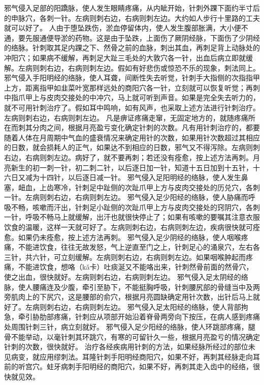 \documentclass[a4paper,12pt,UTF8,twoside]{ctexbook}
\begin{document}
邪气侵入足部的阳蹻脉，使人发生眼睛疼痛，从内眦开始，针刺外踝下面约半寸后的申脉穴，各刺一针。左病则刺右边，右病则刺左边。大约如人步行十里路的工夫就可以好了。
人由于堕坠跌伤，淤血停留体内，使人发生腹部胀满，大小便不通，要先服通便导淤的药物。这是由于坠跌，上面伤了厥阴经脉，下面伤了少阴经的络脉。针刺取其足内踝之下、然骨之前的血脉，刺出其血，再刺足背上动脉处的冲阳穴；如果病不缓解，再刺足大趾三毛处的大敦穴各一针，出血后病立即就缓解。左病则刺右边，右病则刺左边。假如有好悲伤或惊恐不乐的现象，刺法同上。
邪气侵入手阳明经的络脉，使人耳聋，间断性失去听觉，针刺手大指侧的次指指甲上方，距离指甲如韭菜叶宽那样远处的商阳穴各一针，立刻就可以恢复听觉；再刺中指爪甲上与皮肉交接处的中冲穴，马上就可听到声音。如果是完全失去听力的，就不可用针刺治疗了。假如耳中鸣响，如有风声，也采取上述方法进行针刺治疗。左病则刺右边，右病则刺左边。
凡是痹证疼痛走窜，无固定地方的，就随疼痛所在而刺其分肉之间，根据月亮盈亏变化确定针刺的次数。凡有用针刺治疗的，都要随着人体在月周期中气血的盛衰情况来确定用针的次数，如果用针次数超过其相应的日数，就会损耗人的正气，如果达不到相应的日数，邪气又不得泻除。左病则刺右边，右病则刺左边。病好了，就不要再刺；若还没有痊愈，按上述方法再刺。月亮新生的初一刺一针，初二刺二针，以后逐日加一针，知道十五日加到十五针，十六日又减为十四针，以后逐日减一针。
邪气侵入足阳明经的络脉，使人发生鼻塞，衄血，上齿寒冷，针刺足中趾侧的次趾爪甲上方与皮肉交接处的历兑穴，各刺一针。左病则刺右边，右病则刺左边。
邪气侵入足少阳经的络脉，使人胁痛而呼吸不畅，咳嗽而汗出，针刺足小趾侧的次趾爪甲上方与皮肉交接处的窍阴穴，各刺一针，呼吸不畅马上就缓解，出汗也就很快停止了；如果有咳嗽的要嘱其注意衣服饮食的温暖，这样一天就可好了。左病则刺右边，右病则刺左边，疾病很快就可痊愈。如果仍未痊愈，按上述方法再刺。
邪气侵入足少阴经的络脉，使人咽喉疼痛，不能进饮食，往往无故发怒，气上逆直至门之上，针刺足心的涌泉穴，左右各三针，共六针，可立刻缓解。左病则刺右边，右病则刺左边。如果咽喉肿起而疼痛，不能进饮食，想咯（kǎ卡）吐痰涎又不能咯出来，针刺然骨前面的然骨穴，使之出血，很快就好。左病则刺右边，右病则刺左边。
邪气侵入足太阴经的络脉，使人腰痛连及少腹，牵引至胁下，不能挺胸呼吸，针刺腰尻部的骨缝当中及两旁肌肉上的下尻穴，这是腰部的俞穴，根据月亮圆缺确定用针次数，出针后马上就好了。左病则刺右边，右病则刺左边。
邪气侵入足太阳经的络脉，使人背部拘急，牵引胁肋部疼痛，针刺应从项部开始沿着脊骨两旁向下按压，在病人感到疼痛处周围针刺三针，病立刻就好。
邪气侵入足少阳经的络脉，使人环跳部疼痛，腿骨不能举动，以毫针刺其环跳穴，有寒的可留针久一些，根据月亮盈亏的情况确定针刺的次数，很快就好。
治疗各经疾病用针刺的方法，如果经脉所经过的部位未见病变，就应用缪刺法。耳隆针刺手阳明经商阳穴，如果不好，再刺其经脉走向耳前的听宫穴。蛀牙病刺手阳明经的商阳穴，如果不好，再刺其走入齿中的经络，很快就见效。
\end{document}
